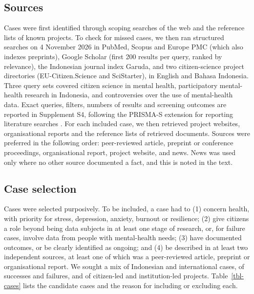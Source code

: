 \documentclass[
  number,
  preprint]{elsarticle}
\begin{document}
\subsection{Sources}\label{sources}

Cases were first identified through scoping searches of the web and the
reference lists of known projects. To check for missed cases, we then
ran structured searches on 4 November 2026 in PubMed, Scopus and Europe
PMC (which also indexes preprints), Google Scholar (first 200 results
per query, ranked by relevance), the Indonesian journal index Garuda,
and two citizen-science project directories (EU-Citizen.Science and
SciStarter), in English and Bahasa Indonesia. Three query sets covered
citizen science in mental health, participatory mental-health research
in Indonesia, and controversies over the use of mental-health data.
Exact queries, filters, numbers of results and screening outcomes are
reported in Supplement S4, following the PRISMA-S extension for
reporting literature searches \citep{rethlefsen2021}. For each included
case, we then retrieved project websites, organisational reports and the
reference lists of retrieved documents. Sources were preferred in the
following order: peer-reviewed article, preprint or conference
proceedings, organisational report, project website, and news. News was
used only where no other source documented a fact, and this is noted in
the text.

\subsection{Case selection}\label{case-selection}

Cases were selected purposively. To be included, a case had to (1)
concern health, with priority for stress, depression, anxiety, burnout
or resilience; (2) give citizens a role beyond being data subjects in at
least one stage of research, or, for failure cases, involve data from
people with mental-health needs; (3) have documented outcomes, or be
clearly identified as ongoing; and (4) be described in at least two
independent sources, at least one of which was a peer-reviewed article,
preprint or organisational report. We sought a mix of Indonesian and
international cases, of successes and failures, and of citizen-led and
institution-led projects. Table~\ref{tbl-cases} lists the candidate
cases and the reason for including or excluding each.
\end{document}

